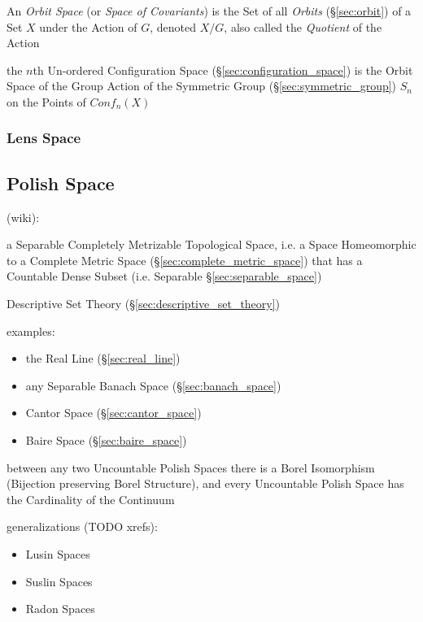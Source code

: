 An \emph{Orbit Space} (or \emph{Space of Covariants}) is the Set of all
\emph{Orbits} (\S\ref{sec:orbit}) of a Set $X$ under the Action of $G$, denoted
$X / G$, also called the \emph{Quotient} of the Action

the $n$th Un-ordered Configuration Space (\S\ref{sec:configuration_space}) is
the Orbit Space of the Group Action of the Symmetric Group
(\S\ref{sec:symmetric_group}) $S_n$ on the Points of $Conf_n(X)$



\subsubsection{Lens Space}\label{sec:lens_space}



\subsection{Polish Space}\label{sec:polish_space}

(wiki):

a Separable Completely Metrizable Topological Space, i.e. a Space Homeomorphic
to a Complete Metric Space (\S\ref{sec:complete_metric_space}) that has a
Countable Dense Subset (i.e. Separable \S\ref{sec:separable_space})

\fist Descriptive Set Theory (\S\ref{sec:descriptive_set_theory})

examples:
\begin{itemize}
  \item the Real Line (\S\ref{sec:real_line})
  \item any Separable Banach Space (\S\ref{sec:banach_space})
  \item Cantor Space (\S\ref{sec:cantor_space})
  \item Baire Space (\S\ref{sec:baire_space})
\end{itemize}

between any two Uncountable Polish Spaces there is a Borel Isomorphism
(Bijection preserving Borel Structure), and every Uncountable Polish Space has
the Cardinality of the Continuum

generalizations (TODO xrefs):
\begin{itemize}
  \item Lusin Spaces
  \item Suslin Spaces
  \item Radon Spaces
\end{itemize}



